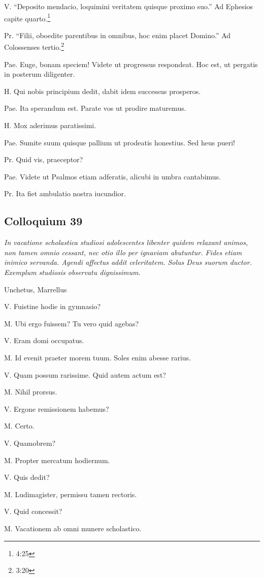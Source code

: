 \documentclass{article}
\begin{document}
V. ``Deposito mendacio, loquimini veritatem quisque proximo suo.'' Ad Ephesios capite quarto.\footnote{4:25}

Pr. ``Filii, oboedite parentibus in omnibus, hoc enim placet Domino.'' Ad Colossenses tertio.\footnote{3:20}

Pae. Euge, bonam speciem! Videte ut progressus respondeat. Hoc est, ut pergatis in posterum diligenter.

H. Qui nobis principium dedit, dabit idem successus prosperos.

Pae. Ita sperandum est. Parate vos ut prodire maturemus.

H. Mox aderimus paratissimi.

Pae. Sumite suum quisque pallium ut prodeatis honestius. Sed heus pueri!

Pr. Quid vis, praeceptor?

Pae. Videte ut Psalmos etiam adferatis, alicubi in umbra cantabimus.

Pr. Ita fiet ambulatio nostra iucundior.

\subsection{Colloquium 39}
\emph{In vacatione scholastica studiosi adolescentes libenter quidem relaxant animos, non tamen omnio cessant, nec otio illo per ignaviam abutuntur. Fides etiam inimico servanda. Agendi affectus addit celeritatem. Solus Deus suorum ductor. Exemplum studiosis observatu dignissimum.}

Unchetus, Marrellus

V. Fuistine hodie in gymnasio?

M. Ubi ergo fuissem? Tu vero quid agebas?

V. Eram domi occupatus.

M. Id evenit praeter morem tuum. Soles enim abesse rarius.

V. Quam possum rarissime. Quid autem actum est?

M. Nihil prorsus.

V. Ergone remissionem habemus?

M. Certo.

V. Quamobrem?

M. Propter mercatum hodiernum.

V. Quis dedit?

M. Ludimagister, permissu tamen rectoris.

V. Quid concessit?

M. Vacationem ab omni munere scholastico.
\end{document}
